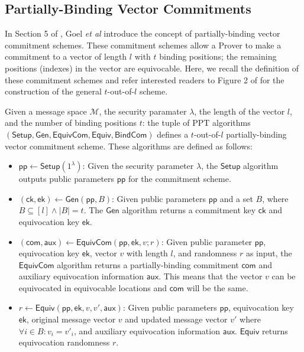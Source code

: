 \subsection{Partially-Binding Vector Commitments}
In Section 5 of \cite{StackingSigmas}, Goel {\em{et al}} introduce the concept of partially-binding vector commitment schemes. 
These commitment schemes allow a Prover to make a commitment to a vector of length $l$ with $t$ binding positions; 
the remaining positions (indexes) in the vector are equivocable. 
Here, we recall the definition of these commitment schemes and refer interested readers to Figure 2 of \cite{StackingSigmas} for the construction of the general $t$-out-of-$l$ 
scheme. 

\begin{definition}\label{def:comm_scheme}
  Given a message space $\mathcal M$, the security paramater $\lambda$, the length of the vector $l$, and the number of binding positions $t$: 
  the tuple of PPT algorithms $(\mathsf{Setup}, \mathsf{Gen}, \mathsf{EquivCom}, \mathsf{Equiv}, \mathsf{BindCom})$ defines a $t$-out-of-$l$ 
  partially-binding vector commitment scheme. These algorithms are defined as follows:
  \begin{itemize}
  \item $\mathsf{pp} \leftarrow \mathsf{Setup}(1^\lambda)$: Given the security parameter $\lambda$,
  the $\mathsf{Setup}$ algorithm outputs public parameters $\mathsf{pp}$ for the commitment scheme.

  \item $(\mathsf{ck},\mathsf{ek}) \leftarrow \mathsf{Gen}(\mathsf{pp},B)$: Given public parameters $\mathsf{pp}$ 
  and a set $B$, where $B \subseteq [l] \land |B| = t$. The $\mathsf{Gen}$ algorithm returns a commitment key $\mathsf{ck}$ and equivocation key $\mathsf{ek}$.

  \item $(\mathsf{com},\mathsf{aux}) \leftarrow \mathsf{EquivCom}(\mathsf{pp},\mathsf{ek},v;r)$: Given public parameter 
  $\mathsf{pp}$, equivocation key $\mathsf{ek}$, vector $v$ with length $l$, and randomness $r$ as input, the $\mathsf{EquivCom}$ algorithm returns a 
  partially-binding commitment $\mathsf{com}$ and auxiliary equivocation information $\mathsf{aux}$. This means that the vector $v$ can be equivocated in 
  equivocable locations and $\mathsf{com}$ will be the same.  

  \item $r \leftarrow \mathsf{Equiv}(\mathsf{pp},\mathsf{ek},v,v',\mathsf{aux})$: Given public parameters $\mathsf{pp}$, 
  equivocation key $\mathsf{ek}$, original message vector $v$ and updated message vector $v'$ 
  where $\forall i \in B: v_i = v'_i$, and auxiliary equivocation information $\mathsf{aux}$. $\mathsf{Equiv}$ returns equivocation 
  randomness $r$.


\end{itemize}
\end{definition}
